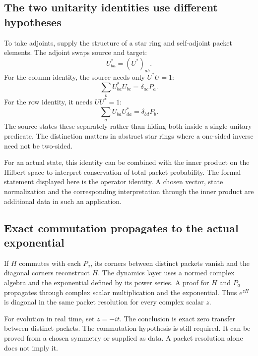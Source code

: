 \subsection{The two unitarity identities use different hypotheses}
To take adjoints, supply the structure of a star ring and self-adjoint packet elements. The adjoint swaps source and target:
\[
U_{ba}^*=(U^*)_{ab}.
\]
For the column identity, the source needs only $U^*U=1$:
\[
\sum_bU_{ba}^*U_{bc}=\delta_{ac}P_a.
\]
For the row identity, it needs $UU^*=1$:
\[
\sum_aU_{ba}U_{da}^*=\delta_{bd}P_b.
\]
The source states these separately rather than hiding both inside a single unitary predicate. The distinction matters in abstract star rings where a one-sided inverse need not be two-sided.



For an actual state, this identity can be combined with the inner product on the Hilbert space to interpret conservation of total packet probability. The formal statement displayed here is the operator identity. A chosen vector, state normalization and the corresponding interpretation through the inner product are additional data in such an application.

\subsection{Exact commutation propagates to the actual exponential}
If $H$ commutes with each $P_a$, its corners between distinct packets vanish and the diagonal corners reconstruct $H$. The dynamics layer uses a normed complex algebra and the exponential defined by its power series. A  proof for $H$ and $P_a$ propagates through complex scalar multiplication and the exponential. Thus $e^{zH}$ is diagonal in the same packet resolution for every complex scalar $z$.


For evolution in real time, set $z=-it$. The conclusion is exact zero transfer between distinct packets. The commutation hypothesis is still required. It can be proved from a chosen symmetry or supplied as data. A packet resolution alone does not imply it.

